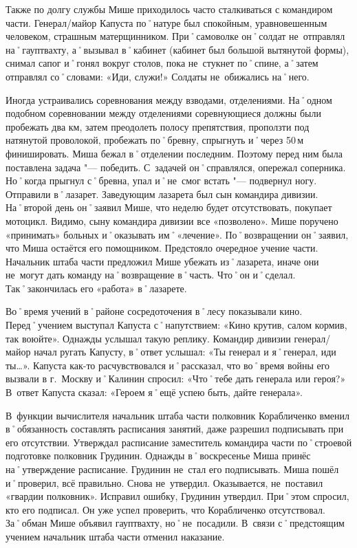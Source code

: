 Также по долгу службы Мише приходилось часто сталкиваться с командиром части. Генерал\-/майор Капуста по˚натуре был спокойным, уравновешенным человеком, страшным матерщинником. При˚самоволке он˚солдат не~отправлял на˚гауптвахту, а˚вызывал в˚кабинет (кабинет был большой вытянутой формы), снимал сапог и˚гонял вокруг столов, пока не~стукнет по˚спине, а˚затем отправлял со˚словами: «Иди, служи!» Солдаты не~обижались на˚него.

Иногда устраивались соревнования между взводами, отделениями. На˚одном подобном соревновании между отделениями соревнующиеся должны были пробежать два км, затем преодолеть полосу препятствия, проползти под натянутой проволокой, пробежать по˚бревну, спрыгнуть и˚через 50\,м финишировать. Миша бежал в˚отделении последним. Поэтому перед ним была поставлена задача "--- победить. С~задачей он˚справлялся, опережал соперника. Но˚когда прыгнул с˚бревна, упал и˚не~смог встать "--- подвернул ногу. Отправили в˚лазарет. Заведующим лазарета был сын командира дивизии. На˚второй день он˚заявил Мише, что неделю будет отсутствовать, покупает мотоцикл. Видимо, сыну командира дивизии все «позволено». Мише поручено «принимать» больных и˚оказывать им˚«лечение». По˚возвращении он˚заявил, что Миша остаётся его помощником. Предстояло очередное учение части. Начальник штаба части предложил Мише убежать из˚лазарета, иначе они не~могут дать команду на˚возвращение в˚часть. Что˚он и˚сделал. Так˚закончилась его «работа» в˚лазарете.

Во˚время учений в˚районе сосредоточения в˚лесу показывали кино. Перед˚учением выступал Капуста с˚напутствием: «Кино крутив, салом кормив, так воюйте». Однажды услышал такую реплику. Командир дивизии генерал\-/майор начал ругать Капусту, в˚ответ услышал: «Ты генерал и я˚генерал, иди ты…». Капуста как-то расчувствовался и˚рассказал, что во˚время войны его вызвали в г.~Москву и˚Калинин спросил: «Что˚тебе дать генерала или героя?» В~ответ Капуста сказал: «Героем я˚ещё успею быть, дайте генерала». 

В~функции вычислителя начальник штаба части полковник Корабличенко вменил в˚обязанность составлять расписания занятий, даже разрешил подписывать при его отсутствии. Утверждал расписание заместитель командира части по˚строевой подготовке полковник Грудинин. Однажды в˚воскресенье Миша принёс на˚утверждение расписание. Грудинин не~стал его подписывать. Миша пошёл и˚проверил, всё правильно. Снова не~утвердил. Оказывается, не~поставил «гвардии полковник». Исправил ошибку, Грудинин утвердил. При˚этом спросил, кто его подписал. Он уже успел проверить, что Корабличенко отсутствовал. За˚обман Мише объявил гауптвахту, но˚не~посадили. В~связи с˚предстоящим учением начальник штаба части отменил наказание.



